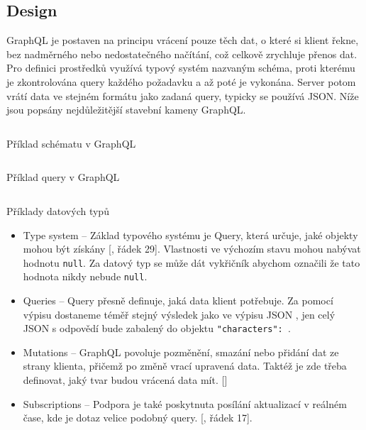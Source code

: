 \subsection{Design}
GraphQL je postaven na principu vrácení pouze těch dat, o které si klient řekne, bez nadměrného nebo nedostatečného načítání, což celkově zrychluje přenos dat. Pro definici prostředků využívá typový systém nazvaným schéma, proti kterému je zkontrolována query každého požadavku a až poté je vykonána. Server potom vrátí data ve stejném formátu jako zadaná query, typicky se používá JSON. Níže jsou popsány nejdůležitější stavební kameny GraphQL. \cite{enwiki:1219709983} \cite{graphqlOfficial}

\begin{listing}[ht!]
    \inputminted[]{ts}{resources/code/standards/playertype.gql}
    \caption{Příklad schématu v GraphQL}
    \label{code:gql_type}
\end{listing}

\begin{listing}[ht!]
    \inputminted[]{graphql}{resources/code//standards/playerquery.gql}
    \caption{Příklad query v GraphQL}
    \label{code:gql_querry}
\end{listing}


\begin{listing}[h]
    \inputminted[]{graphql}{resources/code/standards/types.example.gql}
    \caption{Příklady datových typů}
    \label{code:gql_datatypes}
\end{listing}

\begin{itemize}
    \item Type system  -- Základ typového systému je Query, která určuje, jaké objekty mohou být získány [, řádek 29]. Vlastnosti ve výchozím stavu mohou nabývat hodnotu \texttt{null}. Za datový typ se může dát vykřičník abychom označili že tato hodnota nikdy nebude \texttt{null}.
    \item Queries  -- Query přesně definuje, jaká data klient potřebuje. Za pomocí výpisu  dostaneme téměř stejný výsledek jako ve výpisu JSON , jen celý JSON s odpovědí bude zabalený do objektu \texttt{"characters": {}}.
    \item Mutations  -- GraphQL povoluje pozměnění, smazání nebo přidání dat ze strany klienta, přičemž po změně vrací upravená data. Taktéž je zde třeba definovat, jaký tvar budou vrácená data mít. []
    \item Subscriptions  -- Podpora je také poskytnuta posílání aktualizací v reálném čase, kde je dotaz velice podobný query. [, řádek 17].
\end{itemize}

